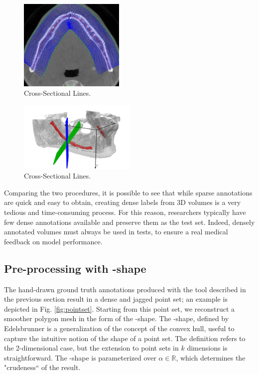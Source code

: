 \begin{figure}[!ht]
  \centering
  \includegraphics[width=0.45\textwidth]{Images/csl.jpg}
  \caption{Cross-Sectional Lines.}
  \label{fig:csl}
\end{figure}

\begin{figure}[!ht]
  \centering
  \includegraphics[width=0.5\textwidth]{Images/csl-orthogonal.jpg}
  \caption{Cross-Sectional Lines.}
  \label{fig:csl-orthogonal}
\end{figure}

Comparing the two procedures, it is possible to see that while sparse
annotations are quick and easy to obtain, creating dense labels from 3D volumes
is a very tedious and time-consuming process. For this reason, researchers
typically have few dense annotations available and preserve them as the test
set. Indeed, densely annotated volumes must always be used in tests, to ensure a
real medical feedback on model performance.

\subsection{Pre-processing with \textalpha-shape}
\label{sec:alpha}
The hand-drawn ground truth annotations produced with the tool described in the
previous section result in a dense and jagged point set; an example is depicted
in Fig. \ref{fig:pointset}. Starting from this point set, we reconstruct a
smoother polygon mesh in the form of the \textalpha-shape. The \textalpha-shape,
defined by Edelsbrunner \etal is a generalization of the concept of the convex
hull, useful to capture the intuitive notion of the shape of a point set. The
definition refers to the 2-dimensional case, but the extension to point sets in
$k$ dimensions is straightforward. The \textalpha-shape is parameterized over
$\alpha \in \mathbb{R}$, which determines the "crudeness`` of the result.\\


